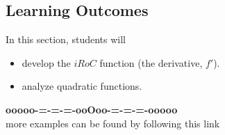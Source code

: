 \documentclass{ximera}
\begin{document}
\subsection*{Learning Outcomes}

\begin{sectionOutcomes}
In this section, students will 

\begin{itemize}
\item develop the $iRoC$ function (the derivative, $f'$).
\item analyze quadratic functions.
\end{itemize}
\end{sectionOutcomes}










\begin{center}
\textbf{\textcolor{green!50!black}{ooooo-=-=-=-ooOoo-=-=-=-ooooo}} \\

more examples can be found by following this link\\ 

\end{center}
\end{document}
